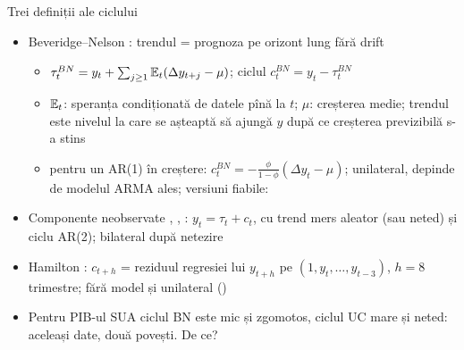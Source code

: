 \begin{frame}{Trei definiții ale ciclului}
\itemsize{\small}
\begin{itemize}
    \item Beveridge--Nelson : trendul = prognoza pe orizont lung fără drift
    \begin{itemize}
        \item $\tau^{BN}_t = y_t + \sum_{j\ge1}\mathbb{E}_t(\Delta y_{t+j} - \mu)$; ciclul $c^{BN}_t = y_t - \tau^{BN}_t$
        \item $\mathbb{E}_t$: speranța condiționată de datele pînă la $t$; $\mu$: creșterea medie; trendul este nivelul la care se așteaptă să ajungă $y$ după ce creșterea previzibilă s-a stins
        \item pentru un AR(1) în creștere: $c^{BN}_t = -\frac{\phi}{1 - \phi}(\Delta y_t - \mu)$; unilateral, depinde de modelul ARMA ales; versiuni fiabile: 
    \end{itemize}
    \item Componente neobservate , , : $y_t = \tau_t + c_t$, cu trend mers aleator (sau neted) și ciclu AR(2); bilateral după netezire
    \item Hamilton : $c_{t+h}$ = reziduul regresiei lui $y_{t+h}$ pe $(1, y_t, \dots, y_{t-3})$, $h = 8$ trimestre; fără model și unilateral ()
    \item Pentru PIB-ul SUA ciclul BN este mic și zgomotos, ciclul UC mare și neted: aceleași date, două povești. De ce?
\end{itemize}
\end{frame}

